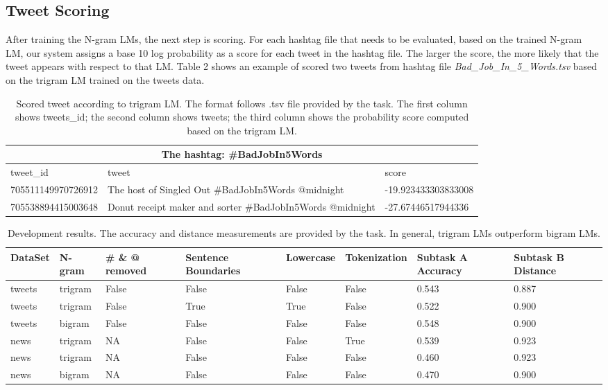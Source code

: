 \documentclass[11pt,a4paper]{article}
\begin{document}
\subsection{Tweet Scoring}
After training the N-gram LMs, the next step is scoring. For each hashtag file that needs to be evaluated, based on the trained N-gram LM, our system assigns a base 10 log probability as a score for each tweet in the hashtag file. The larger the score, the more likely that the tweet appears with respect to that LM. Table 2 shows an example of scored two tweets from hashtag file \textit{Bad\_Job\_In\_5\_Words.tsv} based on the trigram LM trained on the tweets data.
\begin{table*}[h!]
\centering
\begin{tabular}{ |p{4.7cm}|p{4.7cm}|p{4.7cm}| } 
\hline
\multicolumn{3}{|c|}{The hashtag: \#BadJobIn5Words} \\
\hline
tweet\_id & tweet & score \\
\hline 
705511149970726912 & The host of Singled Out \#BadJobIn5Words @midnight & -19.923433303833008 \\
\hline
705538894415003648 & Donut receipt maker and sorter  \#BadJobIn5Words @midnight & -27.67446517944336 \\
\hline
\end{tabular}
\caption{Scored tweet according to trigram LM. The format follows .tsv file provided by the task. The first column shows tweets\_id; the second column shows tweets; the third column shows the probability score computed based on the trigram LM. }
\label{table:2}
\end{table*}

\begin{table*}[h!]
\centering
\begin{tabular}{ |p{1.2cm}|p{1.2cm}|p{1.2cm}|p{1.7cm}|p{1.5cm}|p{1.9cm}|p{1.7cm}|p{1.7cm}|}
\hline
DataSet & N-gram & \# \& @ removed  & Sentence Boundaries & Lowercase & Tokenization & Subtask A Accuracy & Subtask B Distance \\
\hline
tweets & trigram & False & False & False & False & 0.543 & 0.887 \\
\hline
tweets & trigram & False & True & True & False & 0.522 & 0.900 \\
\hline
tweets & bigram & False & False & False & False & 0.548 & 0.900 \\ 
\hline
news & trigram & NA & False & False & True & 0.539 & 0.923 \\
\hline
news & trigram & NA & False & False & False & 0.460 & 0.923 \\
\hline
news & bigram & NA & False & False & False & 0.470 & 0.900 \\
\hline
\end{tabular}
\caption{Development results. The accuracy and distance measurements are provided by the task. In general, trigram LMs outperform bigram LMs.}
\label{table:3}
\end{table*}
\end{document}
